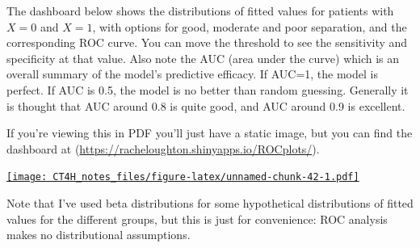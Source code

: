 \documentclass[
  openany]{book}
\theoremstyle{definition}
\theoremstyle{definition}
\theoremstyle{definition}
\theoremstyle{definition}
\theoremstyle{remark}
\begin{document}
The dashboard below shows the distributions of fitted values for patients with \(X=0\) and \(X=1\), with options for good, moderate and poor separation, and the corresponding ROC curve. You can move the threshold to see the sensitivity and specificity at that value. Also note the AUC (area under the curve) which is an overall summary of the model's predictive efficacy. If AUC=1, the model is perfect. If AUC is 0.5, the model is no better than random guessing. Generally it is thought that AUC around 0.8 is quite good, and AUC around 0.9 is excellent.

If you're viewing this in PDF you'll just have a static image, but you can find the dashboard at (\url{https://racheloughton.shinyapps.io/ROCplots/}).

\href{https://racheloughton.shinyapps.io/ROCplots/}{\texttt{[image: CT4H\_notes\_files/figure-latex/unnamed-chunk-42-1.pdf]}}

Note that I've used beta distributions for some hypothetical distributions of fitted values for the different groups, but this is just for convenience: ROC analysis makes no distributional assumptions.
\end{document}
